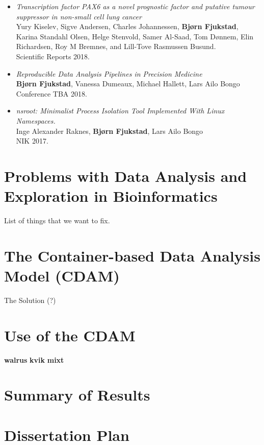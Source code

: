 \begin{itemize}
    \item \emph{Transcription factor PAX6 as a novel prognostic factor and
        putative tumour suppressor in non-small cell lung cancer} 
        \\
        Yury Kiselev, Sigve Andersen, Charles Johannessen, \textbf{Bjørn
        Fjukstad}, Karina Standahl Olsen, Helge Stenvold, Samer Al-Saad, Tom
        Dønnem, Elin Richardsen, Roy M Bremnes, and Lill-Tove Rasmussen Busund. 
        \\
        Scientific Reports 2018. 

    \item \emph{Reproducible Data Analysis Pipelines in Precision Medicine}
        \\
        \textbf{Bjørn Fjukstad}, Vanessa Dumeaux, Michael Hallett, Lars Ailo
        Bongo
        \\
        Conference TBA 2018. 


    \item \emph{nsroot: Minimalist Process Isolation Tool Implemented With Linux
        Namespaces.}
        \\
        Inge Alexander Raknes, \textbf{Bjørn Fjukstad}, Lars Ailo Bongo 
        \\
        NIK 2017. 
        
\end{itemize} 

\section{Problems with Data Analysis and Exploration in Bioinformatics} 
    List of things that we want to fix. 

\section{The Container-based Data Analysis Model (CDAM)} 
    The Solution (?) 

\section{Use of the CDAM} 

\textbf{walrus}
\textbf{kvik} 
\textbf{mixt} 

\section{Summary of Results} 

\section{Dissertation Plan} 


